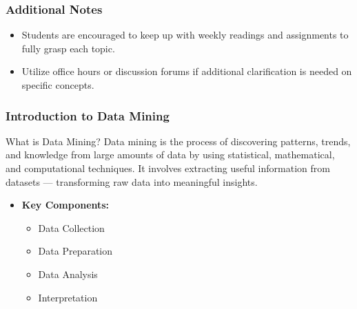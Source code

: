 \documentclass[aspectratio=169]{beamer}
\begin{document}
\begin{frame}[fragile]
    \frametitle{Additional Notes}
    \begin{itemize}
        \item Students are encouraged to keep up with weekly readings and assignments to fully grasp each topic.
        \item Utilize office hours or discussion forums if additional clarification is needed on specific concepts.
    \end{itemize}
\end{frame}

\begin{frame}[fragile]
    \frametitle{Introduction to Data Mining}
    \begin{block}{What is Data Mining?}
        Data mining is the process of discovering patterns, trends, and knowledge from large amounts of data by using statistical, mathematical, and computational techniques. It involves extracting useful information from datasets — transforming raw data into meaningful insights.
    \end{block}
    \begin{itemize}
        \item \textbf{Key Components:}
        \begin{itemize}
            \item Data Collection
            \item Data Preparation
            \item Data Analysis
            \item Interpretation
        \end{itemize}
    \end{itemize}
\end{frame}
\end{document}
